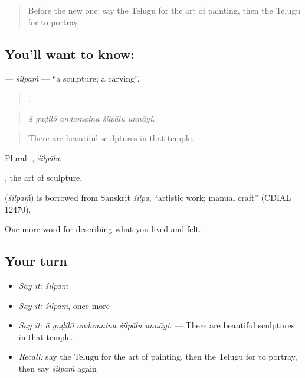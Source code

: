 \label{lesson:TE-C542-silpam}



\begin{quote}
Before the new one: say the Telugu for the art of painting, then the Telugu for to portray.
\end{quote}

\subsection*{You'll want to know: }
\textbf{} — \emph{śilpaṁ} — \textquotedblleft{}a sculpture; a carving\textquotedblright{}.

\begin{quote}
    .
\end{quote}

\begin{quote}
\emph{ā guḍilō andamaina śilpālu unnāyi.}
\end{quote}

\begin{quote}
There are beautiful sculptures in that temple.
\end{quote}

Plural: , \emph{śilpālu}.

, the art of sculpture.

\begin{cousinweb}
\textbf{} (\emph{śilpaṁ}) is borrowed from Sanskrit \emph{śilpa}, \textquotedblleft{}artistic work; manual craft\textquotedblright{} (CDIAL 12470).
\end{cousinweb}

\begin{grammarlens}[title={What you've built}]
One more word for describing what you lived and felt.
\end{grammarlens}

\subsection*{Your turn}
\begin{itemize}
\raggedright
  \item \emph{Say it:} \emph{śilpaṁ}
  \item \emph{Say it:} \emph{śilpaṁ}, once more
  \item \emph{Say it:} \emph{ā guḍilō andamaina śilpālu unnāyi.} — There are beautiful sculptures in that temple.
  \item \emph{Recall:} say the Telugu for the art of painting, then the Telugu for to portray, then say \emph{śilpaṁ} again
\end{itemize}

